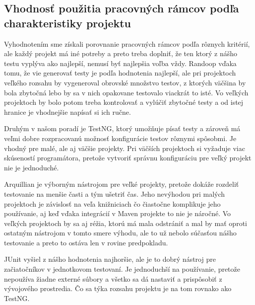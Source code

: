 \documentclass[11pt,twoside,slovak,a4paper]{article}
\begin{document}
	\subsection{Vhodnosť použitia pracovných rámcov podľa charakteristiky projektu}
	Vyhodnotením sme získali porovnanie pracovných rámcov podľa rôznych kritérií, ale každý projekt má iné potreby a preto treba doplniť, že ten ktorý z nášho testu vyplýva ako najlepší, nemusí byť najlepšia voľba vždy. Randoop vďaka tomu, že vie generovať testy je podľa hodnotenia najlepší, ale pri projektoch veľkého rozsahu by vygeneroval obrovské množstvo testov, z ktorých väčšina by bola zbytočná lebo by sa v nich opakovane testovalo viackrát to isté. Vo veľkých projektoch by bolo potom treba kontrolovať a vylúčiť zbytočné testy a od istej hranice je vhodnejšie napísať si ich ručne.
	
	Druhým v našom poradí je TestNG, ktorý umožňuje písať testy a zároveň má veľmi dobre rozpracovanú možnosť konfigurácie testov rôznymi spôsobmi. Je vhodný pre malé, ale aj väčšie projekty. Pri väčších projektoch si vyžaduje viac skúseností programátora, pretože vytvoriť správnu konfiguráciu pre veľký projekt nie je jednoduché.
	
	Arquillian je výborným nástrojom pre veľké projekty, pretože dokáže rozdeliť testovanie na menšie časti a tým ušetriť čas. Jeho nevýhodou pri malých projektoch je závislosť na veľa knižniciach čo čiastočne komplikuje jeho používanie, aj keď vďaka integrácií v Maven projekte to nie je náročné. Vo veľkých projektoch by sa aj réžia, ktorú má mala odstrániť a mal by mať oproti ostatným nástrojom v tomto smere výhodu, ale to už nebolo súčasťou nášho testovanie a preto to ostáva len v rovine predpokladu.
	
	JUnit vyšiel z nášho hodnotenia najhoršie, ale je to dobrý nástroj pre začiatočníkov v jednotkovom testovaní. Je jednoduchší na používanie, pretože nepoužíva žiadne externé súbory a všetko sa dá nastaviť a prispôsobiť z vývojového prostredia. Čo sa týka rozsahu projektu je na tom rovnako ako TestNG.
	
	\newpage
\end{document}
